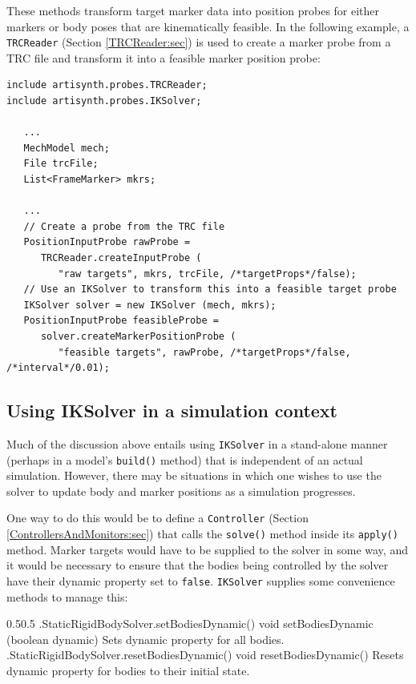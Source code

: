 These methods transform target marker data into position probes for either
markers or body poses that are kinematically feasible.  In the following
example, a {\tt TRCReader} (Section \ref{TRCReader:sec}) is used to create a
marker probe from a TRC file and transform it into a feasible marker position
probe:
%
\begin{lstlisting}[]
include artisynth.probes.TRCReader;
include artisynth.probes.IKSolver;

   ...
   MechModel mech;
   File trcFile;
   List<FrameMarker> mkrs;

   ...
   // Create a probe from the TRC file
   PositionInputProbe rawProbe =
      TRCReader.createInputProbe (
         "raw targets", mkrs, trcFile, /*targetProps*/false);
   // Use an IKSolver to transform this into a feasible target probe
   IKSolver solver = new IKSolver (mech, mkrs);
   PositionInputProbe feasibleProbe =
      solver.createMarkerPositionProbe (
         "feasible targets", rawProbe, /*targetProps*/false, /*interval*/0.01);
\end{lstlisting}
%

\subsection{Using IKSolver in a simulation context}

Much of the discussion above entails using {\tt IKSolver} in a stand-alone
manner (perhaps in a model's {\tt build()} method) that is independent of an
actual simulation. However, there may be situations in which one wishes to use
the solver to update body and marker positions as a simulation progresses.

One way to do this would be to define a {\tt Controller}
(Section \ref{ControllersAndMonitors:sec}) that calls the {\tt solve()} method
inside its {\tt apply()} method. Marker targets would have to be supplied to the
solver in some way, and it would be necessary to ensure that the bodies being
controlled by the solver have their {\sf dynamic} property set to {\tt false}.
{\tt IKSolver} supplies some convenience methods to manage this:

%
\begin{methodtable}{0.5}{0.5}
%
\methodentry
{\mech.StaticRigidBodySolver.setBodiesDynamic()}%
{void setBodiesDynamic (boolean dynamic)}%
{Sets dynamic property for all bodies.}%
%
\methodentry
{\mech.StaticRigidBodySolver.resetBodiesDynamic()}%
{void resetBodiesDynamic()}%
{Resets dynamic property for bodies to their initial state.}%
%
\end{methodtable}
%


